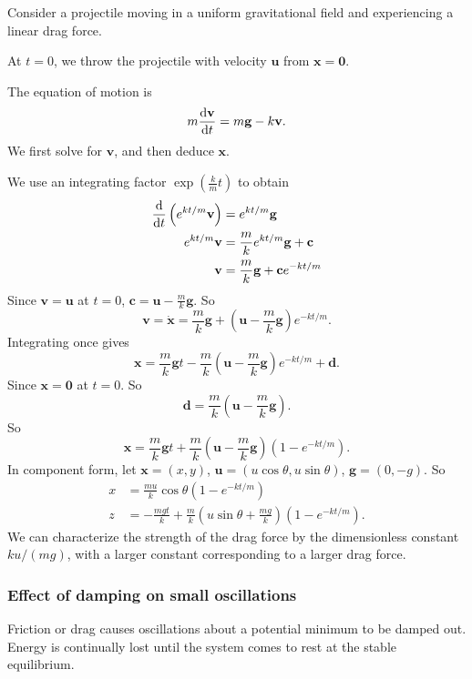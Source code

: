 \documentclass[a4paper]{article}
\begin{document}
\begin{eg}
  Consider a projectile moving in a uniform gravitational field and experiencing a linear drag force.

  At $t = 0$, we throw the projectile with velocity $\mathbf{u}$ from $\mathbf{x} = \mathbf{0}$.

  The equation of motion is
  \[
    m\frac{\mathrm{d} \mathbf{v}}{\mathrm{d} t} = m\mathbf{g} - k\mathbf{v}.
  \]
  We first solve for $\mathbf{v}$, and then deduce $\mathbf{x}$.

  We use an integrating factor $\exp(\frac{k}{m}t)$ to obtain
  \begin{align*}
    \frac{\mathrm{d} }{\mathrm{d} t} \left(e^{kt/m}\mathbf{v}\right) &= e^{kt/m} \mathbf{g}\\
    e^{kt/m} \mathbf{v}&= \frac{m}{k}e^{kt/m}\mathbf{g} + \mathbf{c}\\
    \mathbf{v} &= \frac{m}{k}\mathbf{g} + \mathbf{c} e^{-kt/m}
  \end{align*}
  Since $\mathbf{v} = \mathbf{u}$ at $t = 0$, $\mathbf{c} = \mathbf{u} - \frac{m}{k}\mathbf{g}$. So
  \[
    \mathbf{v} = \dot{\mathbf{x}} = \frac{m}{k}\mathbf{g} + \left(\mathbf{u} - \frac{m}{k}\mathbf{g}\right)e^{-kt/m}.
  \]
  Integrating once gives
  \[
    \mathbf{x} = \frac{m}{k}\mathbf{g}t - \frac{m}{k}\left(\mathbf{u} - \frac{m}{k} \mathbf{g}\right) e^{-kt/m} + \mathbf{d}.
  \]
  Since $\mathbf{x} = \mathbf{0}$ at $t = 0$. So
  \[
    \mathbf{d} = \frac{m}{k}\left(\mathbf{u} - \frac{m}{k}\mathbf{g}\right).
  \]
  So
  \[
    \mathbf{x} = \frac{m}{k}\mathbf{g}t + \frac{m}{k}\left (\mathbf{u} - \frac{m}{k}\mathbf{g}\right)(1 - e^{-kt/m}).
  \]
  In component form, let $\mathbf{x} = (x, y)$, $\mathbf{u} = (u\cos \theta, u\sin \theta)$, $\mathbf{g} = (0, -g)$. So
  \begin{align*}
    x &= \frac{mu}{k}\cos \theta (1 - e^{-kt/m})\\
    z &= -\frac{mgt}{k} + \frac{m}{k}\left(u\sin \theta + \frac{mg}{k}\right)(1 - e^{-kt/m}).
  \end{align*}
  We can characterize the strength of the drag force by the dimensionless constant $ku/(mg)$, with a larger constant corresponding to a larger drag force. 
\end{eg}
\subsubsection{Effect of damping on small oscillations}
Friction or drag causes oscillations about a potential minimum to be damped out. Energy is continually lost until the system comes to rest at the stable equilibrium.
\end{document}
